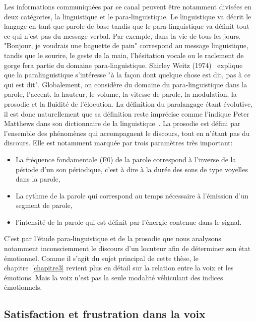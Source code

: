 Les informations communiquées par ce canal peuvent être notamment divisées en deux catégories, la linguistique et le para-linguistique.
Le linguistique va décrit le langage en tant que parole de base tandis que le para-linguistique va définit tout ce qui n'est pas du message verbal. Par exemple, dans la vie de tous les jours, "Bonjour, je voudrais une baguette de pain" correspond au message linguistique, tandis que le sourire, le geste de la main, l'hésitation vocale ou le raclement de gorge fera partie du domaine para-linguistique.
Shirley Weitz (1974)~\cite{Weitz1974} explique que la paralinguistique s'intéresse "à la façon dont quelque chose est dit, pas à ce qui est dit". Globalement, on considère du domaine du para-linguistique dans la parole, l'accent, la hauteur, le volume, la vitesse de parole, la modulation, la prosodie et la fluidité de l'élocution.
La définition du paralangage étant évolutive, il est donc naturellement que sa définition reste imprécise comme l'indique Peter Matthews dans son dictionnaire de la linguistique~\cite{Matthews2014}.
La prosodie est défini par l'ensemble des phénomènes qui accompagnent le discours, tout en n'étant pas du discours. Elle est notamment marquée par trois paramètres très important:
\begin{itemize}
  \item La fréquence fondamentale (F0) de la parole correspond à l'inverse de la période d'un son périodique, c'est à dire à la durée des sons de type voyelles dans la parole,
  \item La rythme de la parole qui correspond au temps nécessaire à l'émission d'un segment de parole,
  \item l'intensité de la parole qui est définit par l'énergie contenue dans le signal.
\end{itemize}
C'est par l'étude para-linguistique et de la prosodie que nous analysons notamment inconsciemment le discours d'un locuteur afin de déterminer son état émotionnel. Comme il s'agit du sujet principal de cette thèse, le chapitre~\ref{chapitre3} revient plus en détail sur la relation entre la voix et les émotions. Mais la voix n'est pas la seule modalité véhiculant des indices émotionnels.

\subsection{Satisfaction et frustration dans la voix}

